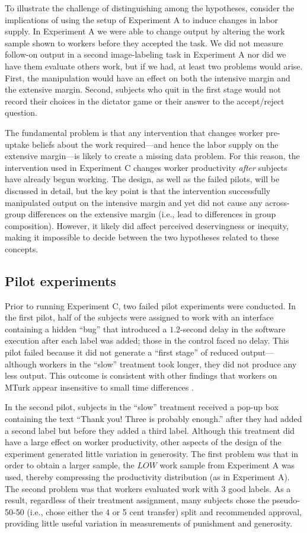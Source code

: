 \documentclass[12pt]{article}
\begin{document}
To illustrate the challenge of distinguishing among the hypotheses,
consider the implications of using the setup of Experiment A to induce
changes in labor supply. In Experiment A we were able to change output
by altering the work sample shown to workers before they accepted the
task. We did not measure follow-on output in a second image-labeling
task in Experiment A nor did we have them evaluate others work, but if
we had, at least two problems would arise. First, the manipulation
would have an effect on both the intensive margin and the extensive
margin. Second, subjects who quit in the first stage would not record
their choices in the dictator game or their answer to the
accept/reject question.

The fundamental problem is that any intervention that changes worker
pre-uptake beliefs about the work required---and hence the labor
supply on the extensive margin---is likely to create a missing data
problem. For this reason, the intervention used in Experiment C
changes worker productivity \emph{after} subjects have already begun
working. The design, as well as the failed pilots, will be discussed
in detail, but the key point is that the intervention successfully
manipulated output on the intensive margin and yet did not cause any
across-group differences on the extensive margin (i.e., lead to
differences in group composition). However, it likely did affect
perceived deservingness or inequity, making it impossible to decide
between the two hypotheses related to these concepts.

\subsection{Pilot experiments} 
Prior to running Experiment C, two failed pilot experiments were
conducted. In the first pilot, half of the subjects were assigned to
work with an interface containing a hidden ``bug'' that introduced a
$1.2$-second delay in the software execution after each label was
added; those in the control faced no delay. This pilot failed because
it did not generate a ``first stage'' of reduced output---although
workers in the ``slow'' treatment took longer, they did not produce
any less output. This outcome is consistent with other findings that
workers on MTurk appear insensitive to small time differences
\citep{horton2010labor}.

In the second pilot, subjects in the ``slow'' treatment received a
pop-up box containing the text ``Thank you! Three is probably
enough.''  after they had added a second label but before they added a
third label. Although this treatment did have a large effect on worker
productivity, other aspects of the design of the experiment generated
little variation in generosity.  The first problem was that in order
to obtain a larger sample, the $LOW$ work sample from Experiment A was
used, thereby compressing the productivity distribution (as in
Experiment A). The second problem was that workers evaluated work with
$3$ good labels. As a result, regardless of their treatment
assignment, many subjects chose the pseudo-50-50 (i.e., chose either
the 4 or 5 cent transfer) split and recommended approval, providing
little useful variation in measurements of punishment and generosity.
\end{document}
